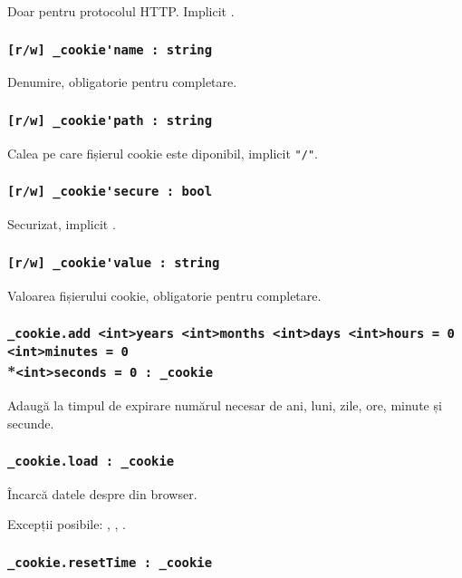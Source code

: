 Doar pentru protocolul HTTP. Implicit \false.

\subsubsection{\lstinline|[r/w] _cookie'name : string|}

Denumire, obligatorie pentru completare.

\subsubsection{\lstinline|[r/w] _cookie'path : string|}

Calea pe care fișierul cookie este diponibil, implicit \lstinline|"/"|.

\subsubsection{\lstinline|[r/w] _cookie'secure : bool|}

Securizat, implicit \false.

\subsubsection{\lstinline|[r/w] _cookie'value : string|}

Valoarea fișierului cookie, obligatorie pentru completare.

\subsubsection{\lstinline|_cookie.add <int>years <int>months <int>days <int>hours = 0 <int>minutes = 0|\\*\noindent\lstinline|<int>seconds = 0 : _cookie|}

Adaugă la timpul de expirare numărul necesar de ani, luni, zile, ore, minute și secunde.

\subsubsection{\lstinline|_cookie.load : _cookie|}

Încarcă datele despre \cookie din browser.

Excepții posibile: , , .

\subsubsection{\lstinline|_cookie.resetTime : _cookie|}

